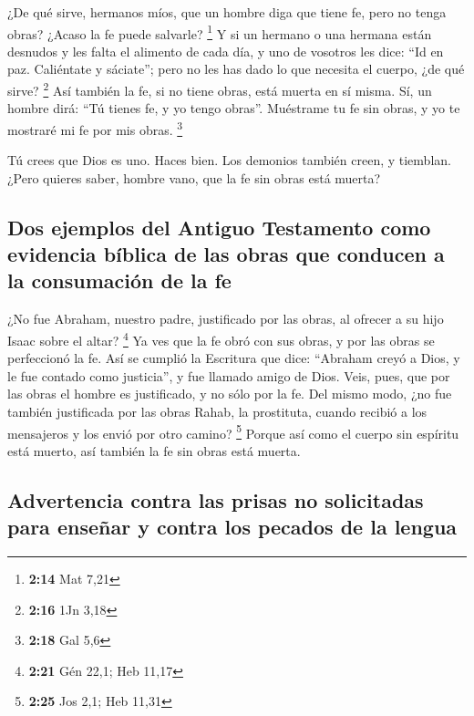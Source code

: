  ¿De qué sirve, hermanos míos, que un hombre diga que
tiene fe, pero no tenga obras? ¿Acaso la fe puede salvarle? \footnote{\textbf{2:14}
  Mat 7,21}  Y si un hermano o una hermana están desnudos
y les falta el alimento de cada día,  y uno de vosotros
les dice: ``Id en paz. Caliéntate y sáciate''; pero no les has dado lo
que necesita el cuerpo, ¿de qué sirve? \footnote{\textbf{2:16} 1Jn 3,18}
 Así también la fe, si no tiene obras, está muerta en sí
misma.  Sí, un hombre dirá: ``Tú tienes fe, y yo tengo
obras''. Muéstrame tu fe sin obras, y yo te mostraré mi fe por mis
obras. \footnote{\textbf{2:18} Gal 5,6}

 Tú crees que Dios es uno. Haces bien. Los demonios
también creen, y tiemblan.  ¿Pero quieres saber, hombre
vano, que la fe sin obras está muerta?

\hypertarget{dos-ejemplos-del-antiguo-testamento-como-evidencia-buxedblica-de-las-obras-que-conducen-a-la-consumaciuxf3n-de-la-fe}{%
\subsection{Dos ejemplos del Antiguo Testamento como evidencia bíblica
de las obras que conducen a la consumación de la
fe}\label{dos-ejemplos-del-antiguo-testamento-como-evidencia-buxedblica-de-las-obras-que-conducen-a-la-consumaciuxf3n-de-la-fe}}

 ¿No fue Abraham, nuestro padre, justificado por las
obras, al ofrecer a su hijo Isaac sobre el altar? \footnote{\textbf{2:21}
  Gén 22,1; Heb 11,17}  Ya ves que la fe obró con sus
obras, y por las obras se perfeccionó la fe.  Así se
cumplió la Escritura que dice: ``Abraham creyó a Dios, y le fue contado
como justicia'', y fue llamado amigo de Dios.  Veis,
pues, que por las obras el hombre es justificado, y no sólo por la fe.
 Del mismo modo, ¿no fue también justificada por las
obras Rahab, la prostituta, cuando recibió a los mensajeros y los envió
por otro camino? \footnote{\textbf{2:25} Jos 2,1; Heb 11,31}
 Porque así como el cuerpo sin espíritu está muerto, así
también la fe sin obras está muerta.

\hypertarget{advertencia-contra-las-prisas-no-solicitadas-para-enseuxf1ar-y-contra-los-pecados-de-la-lengua}{%
\subsection{Advertencia contra las prisas no solicitadas para enseñar y
contra los pecados de la
lengua}\label{advertencia-contra-las-prisas-no-solicitadas-para-enseuxf1ar-y-contra-los-pecados-de-la-lengua}}

